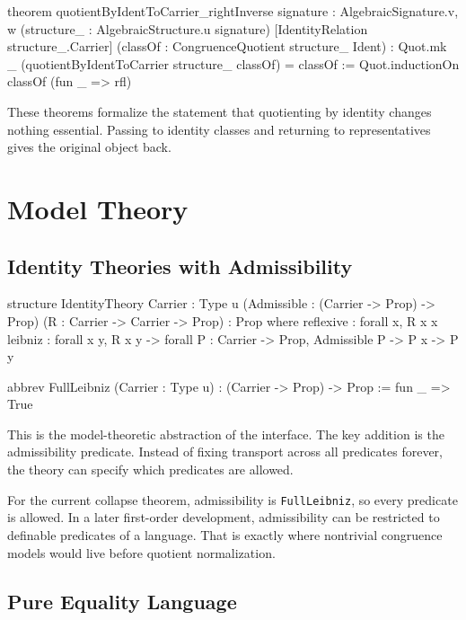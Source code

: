 \documentclass[11pt]{article}
\newcommand{\leaninline}[1]{\texttt{#1}}
\begin{document}
\begin{leanblock}
theorem quotientByIdentToCarrier_rightInverse
    {signature : AlgebraicSignature.{v, w}}
    (structure_ : AlgebraicStructure.{u} signature)
    [IdentityRelation structure_.Carrier]
    (classOf : CongruenceQuotient structure_ Ident) :
    Quot.mk _ (quotientByIdentToCarrier structure_ classOf) = classOf :=
  Quot.inductionOn classOf (fun _ => rfl)
\end{leanblock}

These theorems formalize the statement that quotienting by identity changes nothing essential. Passing to identity classes and returning to representatives gives the original object back.

\section{Model Theory}

\subsection{Identity Theories with Admissibility}

\begin{leanblock}
structure IdentityTheory {Carrier : Type u}
    (Admissible : (Carrier -> Prop) -> Prop)
    (R : Carrier -> Carrier -> Prop) : Prop where
  reflexive : forall x, R x x
  leibniz :
    forall x y, R x y ->
      forall P : Carrier -> Prop, Admissible P -> P x -> P y

abbrev FullLeibniz (Carrier : Type u) : (Carrier -> Prop) -> Prop :=
  fun _ => True
\end{leanblock}

This is the model-theoretic abstraction of the interface. The key addition is the admissibility predicate. Instead of fixing transport across all predicates forever, the theory can specify which predicates are allowed.

For the current collapse theorem, admissibility is \leaninline{FullLeibniz}, so every predicate is allowed. In a later first-order development, admissibility can be restricted to definable predicates of a language. That is exactly where nontrivial congruence models would live before quotient normalization.

\subsection{Pure Equality Language}
\end{document}
